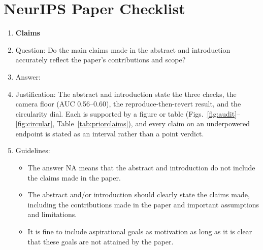 \section*{NeurIPS Paper Checklist}

\begin{enumerate}

\item {\bf Claims}
    \item[] Question: Do the main claims made in the abstract and introduction accurately reflect the paper's contributions and scope?
    \item[] Answer: \answerYes{}
    \item[] Justification: The abstract and introduction state the three checks, the camera floor (AUC \num{0.56}--\num{0.60}), the reproduce-then-revert result, and the circularity dial. Each is supported by a figure or table (Figs.~\ref{fig:audit}--\ref{fig:circular}, Table~\ref{tab:priorclaims}), and every claim on an underpowered endpoint is stated as an interval rather than a point verdict.
    \item[] Guidelines:
    \begin{itemize}
        \item The answer NA means that the abstract and introduction do not include the claims made in the paper.
        \item The abstract and/or introduction should clearly state the claims made, including the contributions made in the paper and important assumptions and limitations.
        \item It is fine to include aspirational goals as motivation as long as it is clear that these goals are not attained by the paper.
    \end{itemize}


\end{enumerate}
